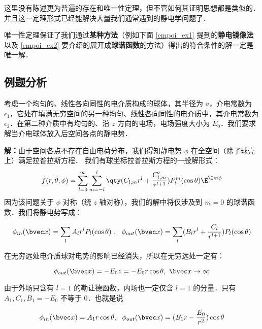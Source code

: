这里没有陈述更为普遍的存在和唯一性定理，但不管如何其证明思想都是类似的．并且这一定理形式已经能解决大量我们通常遇到的静电学问题了．

唯一性定理保证了我们通过\textbf{某种方法}（例如下面 \autoref{empoi_ex1} 提到的\textbf{静电镜像法}以及 \autoref{empoi_ex2} 要介绍的展开成\textbf{球谐函数}的方法）得出的符合条件的解一定是唯一解．
\subsection{例题分析}
\begin{example}{}\label{empoi_ex2}
考虑一个均匀的、线性各向同性的电介质构成的球体，其半径为 $a$，介电常数为 $\epsilon_1$，它处在填满无穷空间的另一种均匀、线性各向同性的电介质中，其介电常数为 $\epsilon_2$．在第二种介质中有均匀的、沿 $z$ 方向的电场，电场强度大小为 $E_0$．我们要求解当介电球体放入后空间各点的静电势．

\end{example}

\textbf{解：}由于空间各点不存在自由电荷分布，我们得知静电势 $\phi$ 在全空间（除了球壳上）满足拉普拉斯方程．
我们有球坐标拉普拉斯方程的一般解形式：
\begin{equation}\label{empoi_eq2}
f(r, \theta, \phi) = \sum_{l = 0}^\infty \sum_{m = -l}^l \qty(C_{l,m} r^l + \frac{C'_{l,m}}{r^{l+1}})P_l^m(\cos\theta)\E^{\I m\phi}
\end{equation}
因为该问题关于 $\phi$ 对称（绕 $z$ 轴对称），我们的解中将仅涉及到 $m=0$ 的球谐函数．我们将静电势写成：

\begin{equation}
\phi_{in}(\bvec x)=\sum_{l}A_lr^lP_l(\cos \theta)\ ,\ \ \phi_{out}(\bvec x)=\sum_{l}(B_lr^l+\frac{C_l}{r^{l+1}})P_l(\cos \theta)
\end{equation}

在无穷远处电介质球对电势的影响已经消失，所以在无穷远处一定有：

\begin{equation}
\phi_{out}(\bvec x)=-E_0z=-E_0r\cos\theta,\ \bvec x\rightarrow \infty
\end{equation}

由于外场只含有 $l=1$ 的勒让德函数，内场也一定仅含 $l=1$ 的分量．只有 $A_1,C_1,B_1=-E_0$ 不等于 $0$．也就是说

\begin{equation}
\phi_{in}(\bvec x)=A_1r\cos \theta,\ \
\phi_{out}(\bvec x)=(B_1r-\frac{E_0}{r^{2}})\cos\theta
\end{equation}

